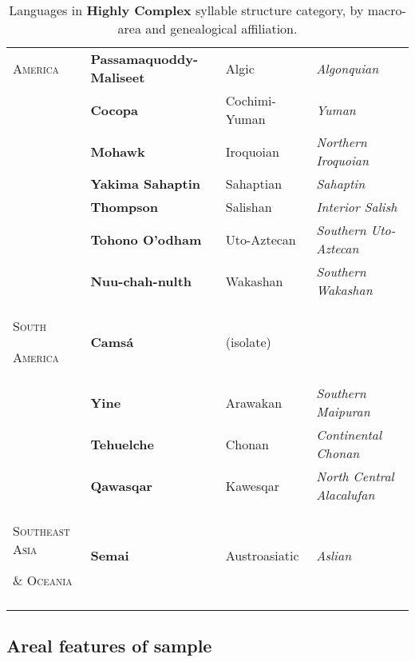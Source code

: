 \begin{table}
\begin{tabularx}{\textwidth}{XXXX}
\textsc{America} & \textbf{Passamaquoddy-Maliseet} & Algic & \textit{Algonquian}\\
\hhline{-~~~} & \textbf{Cocopa} & Cochimi-Yuman & \textit{Yuman}\\
& \textbf{Mohawk} & Iroquoian & \textit{Northern Iroquoian}\\
& \textbf{Yakima Sahaptin} & Sahaptian & \textit{Sahaptin}\\
& \textbf{Thompson} & Salishan & \textit{Interior Salish}\\
& \textbf{Tohono O’odham} & Uto-Aztecan & \textit{Southern Uto-Aztecan}\\
& \textbf{Nuu-chah-nulth} & Wakashan & \textit{Southern Wakashan}\\
\textsc{South} 

\textsc{America} & \textbf{Camsá} & (isolate) & \\
\hhline{-~~~} & \textbf{Yine} & Arawakan & \textit{Southern Maipuran}\\
& \textbf{Tehuelche} & Chonan & \textit{Continental Chonan}\\
& \textbf{Qawasqar} & Kawesqar & \textit{North Central Alacalufan}\\
\textsc{Southeast} \textsc{Asia} 

\textsc{\&} \textsc{Oceania} & \textbf{Semai} & Austroasiatic & \textit{Aslian}\\
\lspbottomrule
\end{tabularx}
\caption{\label{tab:2.7}Languages in \textbf{Highly Complex} syllable structure category, by macro-area and genealogical affiliation.}
\end{table}

\subsection{Areal features of sample}\label{sec:2.4.1}

